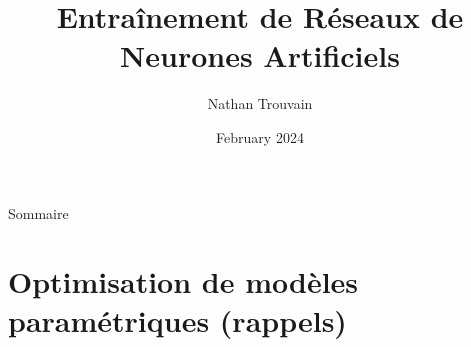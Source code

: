 \documentclass[12pt,dvipsnames,aspectratio=169]{beamer}
\title{Entraînement de Réseaux de Neurones Artificiels}
\author{Nathan Trouvain}
\institute[Inria] %
{
  Inria Mnemosyne\\%
  nathan.trouvain@inria.fr\\%
}
\date{February 2024}
\begin{document}
\begin{frame}[plain]
    \maketitle
\end{frame}

\begin{frame}{Sommaire}
    \setcounter{tocdepth}{1}
    \tableofcontents
\end{frame}

\section{Optimisation de modèles paramétriques (rappels)}



    
\end{document}
